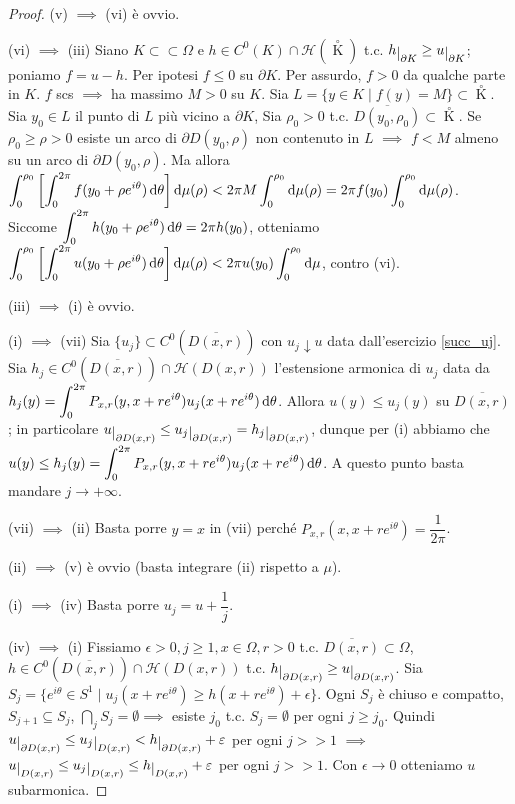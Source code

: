 \begin{proof}
  (v) $\implies$ (vi) è ovvio.

  (vi) $\implies$ (iii) Siano $K \subset \subset \Omega$ e $h \in C^0(K) \cap \mathcal{H}\left(\mathop {K}\limits^ \circ\right)$ t.c. $h\restrict{\partial K} \ge u\restrict{\partial K}$; poniamo $f=u-h$. Per ipotesi $f \le 0$ su $\partial K$. Per assurdo, $f>0$ da qualche parte in $K$.
  $f$ scs $\implies$ ha massimo $M>0$ su $K$. Sia $L=\{y \in K \mid f(y)=M\} \subset \mathop {K}\limits^ \circ$. Sia $y_0 \in L$ il punto di $L$ più vicino a $\partial K$, Sia $\rho_0>0$ t.c. $\overline{D(y_0,\rho_0)} \subset \mathop {K}\limits^ \circ$.
  Se $\rho_0 \ge \rho > 0$ esiste un arco di $\partial D(y_0, \rho)$ non contenuto in $L$ $\implies$ $f<M$ almeno su un arco di $\partial D(y_0, \rho)$.
  Ma allora $\displaystyle \int_0^{\rho_0} \left[\int_0^{2\pi} f(y_0+\rho e^{i\theta})\mathop{}\!\mathrm{d}\theta\right] \mathop{}\!\mathrm{d}\mu(\rho)<2\pi M\int_0^{\rho_0} \mathop{}\!\mathrm{d}\mu(\rho)=2\pi f(y_0)\int_0^{\rho_0} \mathop{}\!\mathrm{d}\mu(\rho)$.
  Siccome $\displaystyle \int_0^{2\pi} h(y_0+\rho e^{i\theta}) \mathop{}\!\mathrm{d}\theta=2\pi h(y_0)$, otteniamo $\displaystyle \int_0^{\rho_0} \left[\int_0^{2\pi} u(y_0+\rho e^{i\theta})\mathop{}\!\mathrm{d}\theta\right]\mathop{}\!\mathrm{d}\mu(\rho)<2\pi u(y_0) \int_0^{\rho_0} \mathop{}\!\mathrm{d} \mu$, contro (vi).

  (iii) $\implies$ (i) è ovvio.

  (i) $\implies$ (vii) Sia $\{u_j\} \subset C^0(\overline{D(x,r)})$ con $u_j \downarrow u$ data dall'esercizio \ref{succ_uj}. Sia $h_j \in C^0(\overline{D(x,r)})\cap \mathcal{H}(D(x,r))$ l'estensione armonica di $u_j$ data da $\displaystyle h_j(y)=\int_0^{2\pi} P_{x,r}(y,x+re^{i\theta})u_j(x+re^{i\theta})\mathop{}\!\mathrm{d}\theta$.
  Allora $u(y) \le u_j(y)$ su $\overline{D(x,r)}$; in particolare $u\restrict{\partial{D(x,r)}} \le u_j\restrict{\partial D(x,r)}=h_j\restrict{\partial D(x,r)}$, dunque per (i) abbiamo che $\displaystyle u(y) \le h_j(y)=\int_0^{2\pi} P_{x,r}(y,x+re^{i\theta})u_j(x+re^{i\theta})\mathop{}\!\mathrm{d}\theta$. A questo punto basta mandare $j \longrightarrow +\infty$.

  (vii) $\implies$ (ii) Basta porre $y=x$ in (vii) perché $P_{x,r}(x,x+re^{i\theta})=\dfrac{1}{2\pi}$.

  (ii) $\implies$ (v) è ovvio (basta integrare (ii) rispetto a $\mu$).

  (i) $\implies$ (iv) Basta porre $u_j=u+\dfrac{1}{j}$.

  (iv) $\implies$ (i) Fissiamo $\epsilon>0, j \ge 1, x \in \Omega, r>0$ t.c. $\overline{D(x,r)} \subset \Omega$, $h \in C^0(\overline{D(x,r)})\cap \mathcal{H}(D(x,r))$ t.c. $h\restrict{\partial D(x,r)} \ge u\restrict{\partial D(x,r)}$.
  Sia $S_j=\{e^{i\theta} \in S^1 \mid u_j(x+re^{i\theta}) \ge h(x+re^{i\theta})+\epsilon\}$. Ogni $S_j$ è chiuso e compatto, $S_{j+1} \subseteq S_j$, $\displaystyle \bigcap_j S_j=\emptyset \implies$ esiste $j_0$ t.c. $S_j=\emptyset$ per ogni $j \ge j_0$.
  Quindi $u\restrict{\partial D(x,r)} \le u_j\restrict{D(x,r)}<h\restrict{\partial D(x,r)}+\epsilon$ per ogni $j >> 1$ $\implies$ $u\restrict{D(x,r)} \le u_j\restrict{D(x,r)} \le h\restrict{D(x,r)}+\epsilon$ per ogni $j>>1$. Con $\epsilon \longrightarrow 0$ otteniamo $u$ subarmonica.


\end{proof}
